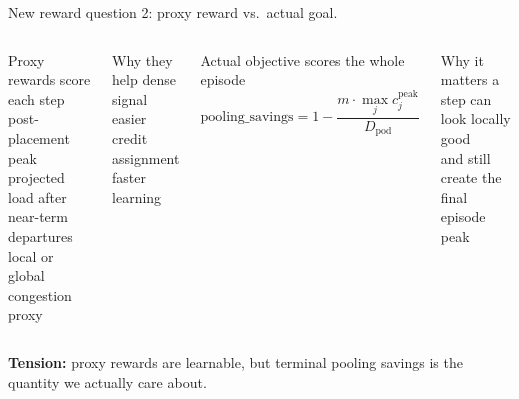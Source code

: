 \documentclass[11pt,aspectratio=43]{beamer}
\begin{document}

\begin{frame}{New reward question 2: proxy reward vs.\ actual goal.}

  \begin{columns}[T,onlytextwidth]
      \begin{block}{Proxy rewards score each step}
        \centering
        \small post-placement peak\\[0.2em]
        projected load after near-term departures\\[0.2em]
        local or global congestion proxy
      \end{block}

      \vspace{0.5em}
      \begin{block}{Why they help}
        \centering
        dense signal\\
        easier credit assignment\\
        faster learning
      \end{block}

      \begin{block}{Actual objective scores the whole episode}
        \[
        \text{pooling\_savings}
        =
        1 -
        \frac{m \cdot \max_j c_j^{\text{peak}}}{D_{\text{pod}}}
        \]
      \end{block}

      \vspace{0.5em}
      \begin{block}{Why it matters}
        \centering
        a step can look locally good\\
        and still create the final episode peak
      \end{block}
  \end{columns}

  \vspace{0.4em}
  \begin{center}
    \small\textbf{Tension:} proxy rewards are learnable, but terminal pooling savings is the quantity we actually care about.
  \end{center}

\end{frame}

\end{document}
